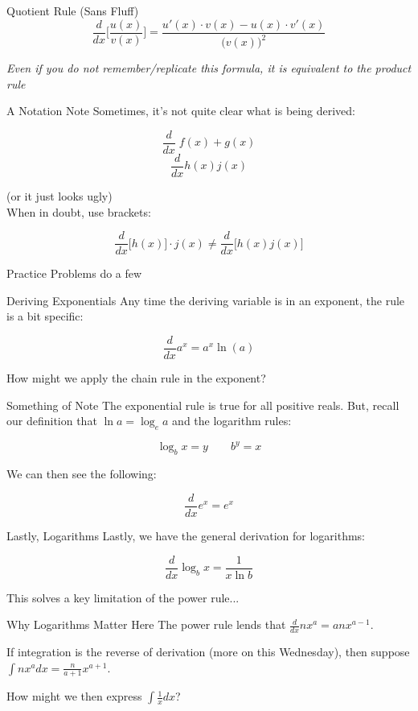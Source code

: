 \documentclass[10pt]{beamer}
\begin{document}
\begin{frame}{Quotient Rule (Sans Fluff)}
    \[\frac{d}{dx} \bigg[ \frac{u(x)}{v(x)} \bigg] = \frac{u'(x) \cdot v(x) - u(x) \cdot v'(x)}{\Big(v(x)\Big)^2}\]
    \vspace{1cm}
    
    \textit{Even if you do not remember/replicate this formula, it is equivalent to the product rule}
\end{frame}

\begin{frame}{A Notation Note}
    Sometimes, it's not quite clear what is being derived:

    \[\frac{d}{dx} \; f(x) + g(x)\]
    \[\frac{d}{dx}h(x)j(x)\]

    (or it just looks ugly) \\
\vspace{.5cm}
    When in doubt, use brackets:

    \[\frac{d}{dx} \bigg[h(x)\bigg] \cdot j(x) \neq \frac{d}{dx}\bigg[ h(x) j(x) \bigg]\]
\end{frame}

\begin{frame}{Practice Problems}
    do a few
\end{frame}

\begin{frame}{Deriving Exponentials}
    Any time the deriving variable is in an exponent, the rule is a bit specific:

    \[\frac{d}{dx} a^x = a^x \ln (a)\]

    How might we apply the chain rule in the exponent?
\end{frame}

\begin{frame}{Something of Note}
    The exponential rule is true for all positive reals. But, recall our definition that $\ln a = \log_e a$ and the logarithm rules:

    \[\log_bx=y \quad \quad b^y=x\]

    We can then see the following:

    \[\frac{d}{dx} e^x = e^x\]
\end{frame}

\begin{frame}{Lastly, Logarithms}
    Lastly, we have the general derivation for logarithms:

    \[\frac{d}{dx} \log_bx = \frac{1}{x \ln b}\]

    This solves a key limitation of the power rule...
\end{frame}

\begin{frame}{Why Logarithms Matter Here}
    The power rule lends that $\frac{d}{dx} nx^a = anx^{a-1}$.

    If integration is the reverse of derivation (more on this Wednesday), then suppose $\int nx^a dx = \frac{n}{a+1}x^{a+1}$.

    How might we then express $\int \frac{1}{x} dx$?
\end{frame}
\end{document}
